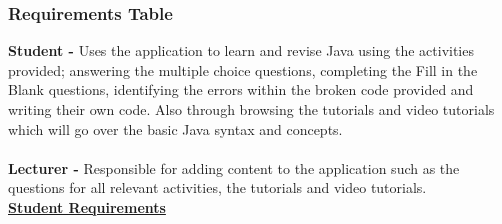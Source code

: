 \documentclass{article}
\begin{document}
\subsubsection{Requirements Table}

\textbf{Student - } Uses the application to learn and revise Java using the activities provided; answering the multiple choice questions, completing the Fill in the Blank questions, identifying the errors within the broken code provided and writing their own code. Also through browsing the tutorials and video tutorials which will go over the basic Java syntax and concepts.\\
\\
\textbf{Lecturer - } Responsible for adding content to the application such as the questions for all relevant activities, the tutorials and video tutorials.\\

\textbf{\underline{Student Requirements}}\\
\end{document}
